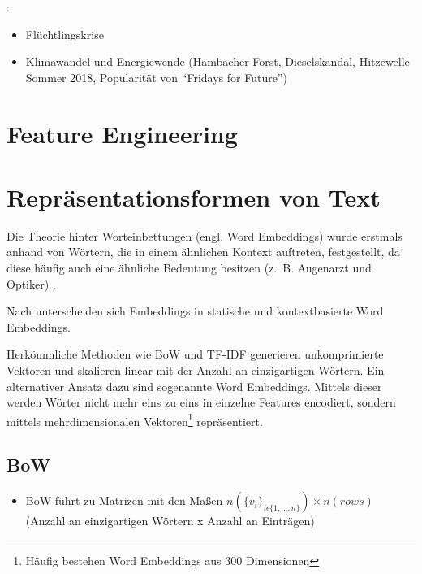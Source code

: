 \citeauthor{niedermayer_entwicklung_2020} \autocite{niedermayer_entwicklung_2020}:
\begin{itemize}
    \item Flüchtlingskrise
    \item Klimawandel und Energiewende (Hambacher Forst, Dieselskandal, Hitzewelle Sommer \num{2018}, Popularität von \enquote{Fridays for Future})
\end{itemize}

\section{Feature Engineering}


\section{Repräsentationsformen von Text}


Die Theorie hinter Worteinbettungen (engl. Word Embeddings) wurde erstmals anhand von Wörtern, die in einem ähnlichen Kontext auftreten, festgestellt, da diese häufig auch eine ähnliche Bedeutung besitzen (z. B. Augenarzt und Optiker) \autocite[103]{jurafsky_speech_2023}.

Nach \textcite[103]{jurafsky_speech_2023} unterscheiden sich Embeddings in statische und kontextbasierte Word Embeddings.

Herkömmliche Methoden wie \ac{BoW} und \ac{TF-IDF} generieren unkomprimierte Vektoren und skalieren linear mit der Anzahl an einzigartigen Wörtern. Ein alternativer Ansatz dazu sind sogenannte Word Embeddings. Mittels dieser werden Wörter nicht mehr eins zu eins in einzelne Features encodiert, sondern mittels mehrdimensionalen Vektoren\footnote{Häufig bestehen Word Embeddings aus \num{300} Dimensionen} repräsentiert.

\subsection*{\acl{BoW}}


\begin{itemize}
    \item \ac{BoW} führt zu Matrizen mit den Maßen \(n(\{v_i\}_{i\epsilon\{1,\dots,n\}}) \times n(rows)\) (Anzahl an einzigartigen Wörtern x Anzahl an Einträgen)
\end{itemize}

